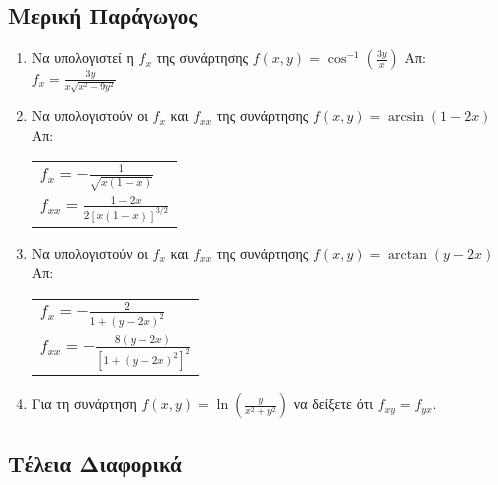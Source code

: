 


\pagestyle{askhseis}



\begin{center}
\minibox{\large \bfseries \textcolor{Col1}{Ασκήσεις Επανάληψης}}
\end{center}

\vspace{\baselineskip}


\subsection*{Μερική Παράγωγος}

\begin{enumerate}

  \item Να υπολογιστεί η $ f_{x} $ της συνάρτησης $ f(x,y) =
    \cos^{-1}{(\frac{3y}{x})} $ 
    \hfill Απ: $ f_{x} = \frac{3y}{x \sqrt{x^{2}-9y^{2}}} $ 

  \item Να υπολογιστούν οι $ f_{x} $ και $ f_{xx} $ της συνάρτησης 
    $ f(x,y) = \arcsin(1-2x) $ 
    \hfill Απ: 
    \begin{tabular}{l}
      $ f_{x} = - \frac{1}{\sqrt{x(1-x)}} $ \\ 
      $ f_{xx} = \frac{1-2x}{2[x(1-x)]^{3/2}} $ 
    \end{tabular}

  \item Να υπολογιστούν οι $ f_{x} $ και $ f_{xx} $ της συνάρτησης 
    $ f(x,y) = \arctan{(y-2x)} $
      \hfill Απ: 
      \begin{tabular}{l}
        $ f_{x} = - \frac{2}{1 + (y-2x)^{2 }} $ \\ 
        $ f_{xx} = - \frac{8(y-2x)}{[1+(y-2x)^{2}]^{2}} $ 
      \end{tabular}

  \item Για τη συνάρτηση $ f(x,y) = \ln{(\frac{y}{x^{2} + y^2})} $ να δείξετε ότι 
    $ f_{xy}= f_{yx} $.
\end{enumerate}

\subsection*{Τέλεια Διαφορικά}

